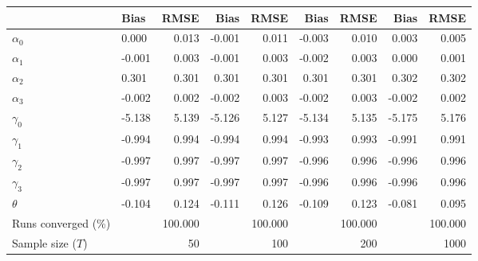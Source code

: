 
\begin{tabular}[t]{llrrrrrrr}
\toprule
  & Bias & RMSE & Bias & RMSE & Bias & RMSE & Bias & RMSE\\
\midrule
$\alpha_{0}$ & 0.000 & 0.013 & -0.001 & 0.011 & -0.003 & 0.010 & 0.003 & 0.005\\
$\alpha_{1}$ & -0.001 & 0.003 & -0.001 & 0.003 & -0.002 & 0.003 & 0.000 & 0.001\\
$\alpha_{2}$ & 0.301 & 0.301 & 0.301 & 0.301 & 0.301 & 0.301 & 0.302 & 0.302\\
$\alpha_{3}$ & -0.002 & 0.002 & -0.002 & 0.003 & -0.002 & 0.003 & -0.002 & 0.002\\
$\gamma_{0}$ & -5.138 & 5.139 & -5.126 & 5.127 & -5.134 & 5.135 & -5.175 & 5.176\\
$\gamma_{1}$ & -0.994 & 0.994 & -0.994 & 0.994 & -0.993 & 0.993 & -0.991 & 0.991\\
$\gamma_{2}$ & -0.997 & 0.997 & -0.997 & 0.997 & -0.996 & 0.996 & -0.996 & 0.996\\
$\gamma_{3}$ & -0.997 & 0.997 & -0.997 & 0.997 & -0.996 & 0.996 & -0.996 & 0.996\\
$\theta$ & -0.104 & 0.124 & -0.111 & 0.126 & -0.109 & 0.123 & -0.081 & 0.095\\
Runs converged (\%) &  & 100.000 &  & 100.000 &  & 100.000 &  & 100.000\\
Sample size ($T$) &  & 50 &  & 100 &  & 200 &  & 1000\\
\bottomrule
\end{tabular}
